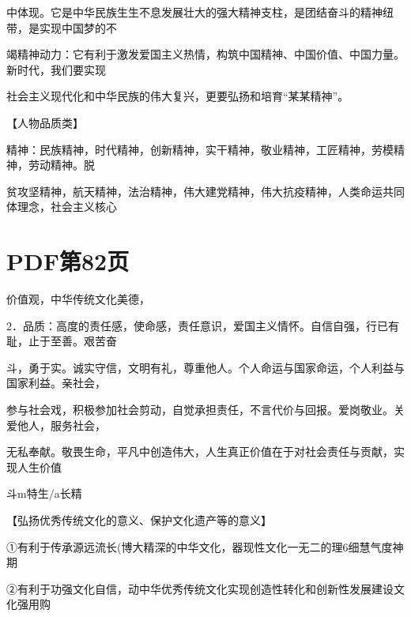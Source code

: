 \documentclass[lang=cn,11pt]{elegantbook}
\newcommand{\daofasym}[1]{{\daofasymbolfont #1}}
\newcommand{\daofasym}[1]{#1}
\begin{document}
中体现。它是中华民族生生不息发展壮大的强大精神支柱，是团结奋斗的精神纽带，是实现中国梦的不\par

竭精神动力：它有利于激发爱国主义热情，构筑中国精神、中国价值、中国力量。新时代，我们要实现\par

社会主义现代化和中华民族的伟大复兴，更要弘扬和培育“某某精神”。\par

【人物品质类】\par

精神：民族精神，时代精神，创新精神，实干精神，敬业精神，工匠精神，劳模精神，劳动精神。脱\par

贫攻坚精神，航天精神，法治精神，伟大建党精神，伟大抗疫精神，人类命运共同体理念，社会主义核心\par


\section*{PDF第82页}

价值观，中华传统文化美德，\par

2．品质：高度的责任感，使命感，责任意识，爱国主义情怀。自信自强，行已有耻，止于至善。艰苦奋\par

斗，勇于实。诚实守信，文明有礼，尊重他人。个人命运与国家命运，个人利益与国家利益。亲社会，\par

参与社会戏，积极参加社会剪动，自觉承担责任，不言代价与回报。爱岗敬业。关爱他人，服务社会，\par

无私奉献。敬畏生命，平凡中创造伟大，人生真正价值在于对社会责任与贡献，实现人生价值\par

斗m特生/a长精\par

【弘扬优秀传统文化的意义、保护文化遗产等的意义】\par

\daofasym{①}有利于传承源远流长(博大精深的中华文化，器现性文化一无二的理6细慧气度神期\par

\daofasym{②}有利于功强文化自信，动中华优秀传统文化实现创造性转化和创新性发展建设文化强用购\par
\end{document}
